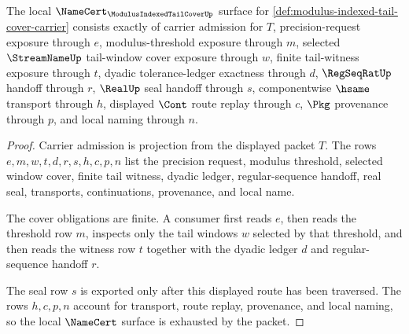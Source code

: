 \begin{theorem}
\label{thm:modulus-indexed-tail-cover-namecert-obligations}
The local $\NameCert_{\ModulusIndexedTailCoverUp}$ surface for \autoref{def:modulus-indexed-tail-cover-carrier} consists exactly of carrier admission for $T$, precision-request exposure through $e$, modulus-threshold exposure through $m$, selected $\StreamNameUp$ tail-window cover exposure through $w$, finite tail-witness exposure through $t$, dyadic tolerance-ledger exactness through $d$, $\RegSeqRatUp$ handoff through $r$, $\RealUp$ seal handoff through $s$, componentwise $\hsame$ transport through $h$, displayed $\Cont$ route replay through $c$, $\Pkg$ provenance through $p$, and local naming through $n$.
\end{theorem}
\begin{proof}
Carrier admission is projection from the displayed packet $T$. The rows $e,m,w,t,d,r,s,h,c,p,n$ list the precision request, modulus threshold, selected window cover, finite tail witness, dyadic ledger, regular-sequence handoff, real seal, transports, continuations, provenance, and local name.

The cover obligations are finite. A consumer first reads $e$, then reads the threshold row $m$, inspects only the tail windows $w$ selected by that threshold, and then reads the witness row $t$ together with the dyadic ledger $d$ and regular-sequence handoff $r$.

The seal row $s$ is exported only after this displayed route has been traversed. The rows $h,c,p,n$ account for transport, route replay, provenance, and local naming, so the local $\NameCert$ surface is exhausted by the packet.
\end{proof}

